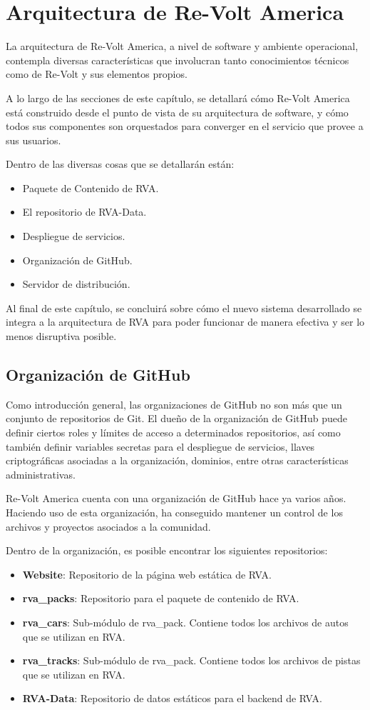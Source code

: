 \chapter{Arquitectura de Re-Volt America}
La arquitectura de Re-Volt America, a nivel de software y ambiente operacional, contempla diversas características que involucran tanto conocimientos técnicos como de Re-Volt y sus elementos propios.

A lo largo de las secciones de este capítulo, se detallará cómo Re-Volt America está construido desde el punto de vista de su arquitectura de software, y cómo todos sus componentes son orquestados para converger en el servicio que provee a sus usuarios.

Dentro de las diversas cosas que se detallarán están:
\begin{itemize}
  \item Paquete de Contenido de RVA.
  \item El repositorio de RVA-Data.
  \item Despliegue de servicios.
  \item Organización de GitHub.
  \item Servidor de distribución.
\end{itemize}

Al final de este capítulo, se concluirá sobre cómo el nuevo sistema desarrollado se integra a la arquitectura de RVA para poder funcionar de manera efectiva y ser lo menos  disruptiva posible.

\section{Organización de GitHub}
Como introducción general, las organizaciones de GitHub no son más que un conjunto de repositorios de Git. El dueño de la organización de GitHub puede definir ciertos roles y límites de acceso a determinados repositorios, así como también definir variables secretas para el despliegue de servicios, llaves criptográficas asociadas a la organización, dominios, entre otras características administrativas.

Re-Volt America cuenta con una organización de GitHub hace ya varios años. Haciendo uso de esta organización, ha conseguido mantener un control de los archivos y proyectos asociados a la comunidad.

Dentro de la organización, es posible encontrar los siguientes repositorios:

\begin{itemize}
  \item \textbf{Website}: Repositorio de la página web estática de RVA.
  \item \textbf{rva\_packs}: Repositorio para el paquete de contenido de RVA.
  \item \textbf{rva\_cars}: Sub-módulo de rva\_pack. Contiene todos los archivos de autos que se utilizan en RVA.
  \item \textbf{rva\_tracks}: Sub-módulo de rva\_pack. Contiene todos los archivos de pistas que se utilizan en RVA.
  \item \textbf{RVA-Data}: Repositorio de datos estáticos para el backend de RVA.
\end{itemize}

